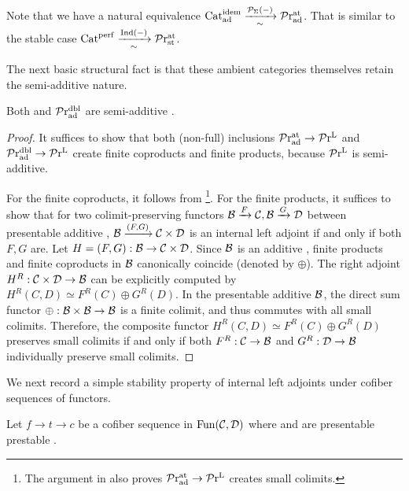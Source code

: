 \documentclass[a4paper,10pt, oneside]{amsart}
\begin{document}
	\begin{rem}
		Note that we have a natural equivalence $\mathrm{Cat}_{\mathrm{ad}}^{\mathrm{idem}}\xrightarrow[\sim]{\mathcal{P}_{\Sigma}(-)}\mathcal{P}\mathrm{r}_{\mathrm{ad}}^{\mathrm{at}}$. That is similar to the stable case $\mathrm{Cat}^{\mathrm{perf}}\xrightarrow[\sim]{\mathrm{Ind}(-)}\mathcal{P}\mathrm{r}_{\mathrm{st}}^{\mathrm{at}}$.
	\end{rem}
	The next basic structural fact is that these ambient categories themselves retain the semi-additive nature.
	\begin{prop}
		Both \pradat and $\mathcal{P}\mathrm{r}_{\mathrm{ad}}^{\mathrm{dbl}}$ are  semi-additive \infcats.
	\end{prop}
	\begin{proof}
		It suffices to show that both (non-full) inclusions $\mathcal{P}\mathrm{r}_{\mathrm{ad}}^{\mathrm{at}}\to \mathcal{P}\mathrm{r}^\mathrm{L}$ and $\mathcal{P}\mathrm{r}_{\mathrm{ad}}^{\mathrm{dbl}} \to \mathcal{P}\mathrm{r}^\mathrm{L}$ create finite coproducts and finite products, because $\mathcal{P}\mathrm{r}^\mathrm{L}$ is semi-additive.
		
		For the finite coproducts, it follows from \cite[Proposition 1.62]{ramzi2024dualizable}\footnote{The argument in \cite[Proposition 1.62]{ramzi2024dualizable} also proves $\mathcal{P}\mathrm{r}_{\mathrm{ad}}^{\mathrm{at}}\to \mathcal{P}\mathrm{r}^\mathrm{L}$ creates small colimits.}. 
		For the finite products, it suffices to show that for two colimit-preserving functors $\mathcal{B}\xrightarrow{F}\mathcal{C}, \mathcal{B}\xrightarrow{G}\mathcal{D}$ between presentable additive \infcats, $\mathcal{B}\xrightarrow{(F,G)}\mathcal{C}\times \mathcal{D}$ is an internal left adjoint if and only if both $F,G$ are. 	Let $H = (F, G): \mathcal{B} \to \mathcal{C} \times \mathcal{D}$. Since $\mathcal{B}$ is an additive \infcat, finite products and finite coproducts in $\mathcal{B}$ canonically coincide (denoted by $\oplus$). The right adjoint $H^R: \mathcal{C} \times \mathcal{D} \to \mathcal{B}$ can be explicitly computed by $H^R(C, D) \simeq F^R(C) \oplus G^R(D)$.
			 In the presentable additive \infcat $\mathcal{B}$, the direct sum functor $\oplus: \mathcal{B} \times \mathcal{B} \to \mathcal{B}$ is a finite colimit, and thus commutes with all small colimits. Therefore, the composite functor $H^R(C, D) \simeq F^R(C) \oplus G^R(D)$ preserves small colimits if and only if both $F^R: \mathcal{C} \to \mathcal{B}$ and $G^R: \mathcal{D} \to \mathcal{B}$ individually preserve small colimits. 
			
	\end{proof}
	We next record a simple stability property of internal left adjoints under cofiber sequences of functors.
	\begin{lem}\label{functorext}
	Let $f\to t\to c$ be a cofiber sequence in $\operatorname{Fun}(\mathcal{C},\mathcal{D})$ where \mcc and \mcd are presentable prestable \infcats. 
\end{lem}
\end{document}
